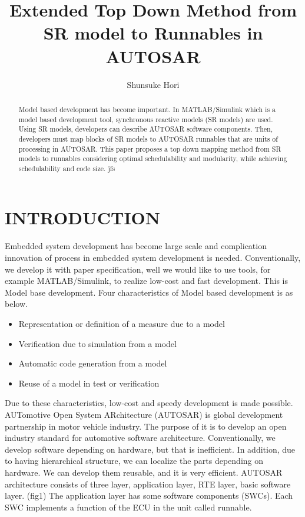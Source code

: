 \documentclass[conference,compsoc]{IEEEtran}
\title{Extended Top Down Method from SR model to Runnables in AUTOSAR}
\author{Shunsuke Hori}
\begin{document}
\maketitle

\begin{abstract}
 Model based development has become important.
In MATLAB/Simulink which is a model based development tool, synchronous reactive models (SR models) are used.
Using SR models, developers can describe AUTOSAR software components.
Then, developers must map blocks of SR models to AUTOSAR runnables that are units of processing in AUTOSAR.
This paper proposes a top down mapping method from SR models to runnables considering optimal schedulability and modularity, while achieving schedulability and code size.
jfs
\end{abstract}
	\section{INTRODUCTION}
 Embedded system development has become large scale and complication innovation of process in embedded system development is needed.
Conventionally, we develop it with paper specification, well we would like to use tools, for example MATLAB/Simulink, to realize low-cost and fast development.
This is Model base development.
Four characteristics of Model based development is as below.
	\begin{itemize}
		\item Representation or definition of a measure due to a model
		\item Verification due to simulation from a model
		\item Automatic code generation from a model
		\item Reuse of a model in test or verification
	\end{itemize} 
Due to these characteristics, low-cost and speedy development is made possible.
 AUTomotive Open System ARchitecture (AUTOSAR) is global development partnership in motor vehicle industry.
The purpose of it is to develop an open industry standard for automotive software architecture.
Conventionally, we develop software depending on hardware, but that is inefficient.
In addition, due to having hierarchical structure, we can localize the parts depending on hardware.
We can develop them reusable, and it is very efficient. 
AUTOSAR architecture consists of three layer, application layer, RTE layer, basic software layer. (fig1)
 The application layer has some software components (SWCs).
Each SWC implements a function of the ECU in the unit called runnable.
\end{document}
